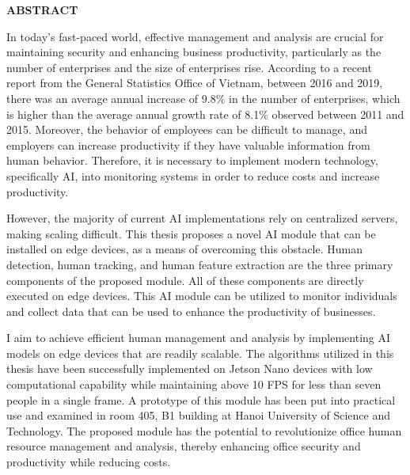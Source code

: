\documentclass[../main.tex]{subfiles}
\begin{document}
\begin{center}
    \Large{\textbf{ABSTRACT}}\\
\end{center}
\vspace{1cm}

In today's fast-paced world, effective management and analysis are crucial for maintaining security and enhancing business productivity, particularly as the number of enterprises and the size of enterprises rise. According to a recent report from the General Statistics Office of Vietnam, between 2016 and 2019, there was an average annual increase of 9.8\% in the number of enterprises, which is higher than the average annual growth rate of 8.1\% observed between 2011 and 2015. Moreover, the behavior of employees can be difficult to manage, and employers can increase productivity if they have valuable information from human behavior. Therefore, it is necessary to implement modern technology, specifically AI, into monitoring systems in order to reduce costs and increase productivity.

However, the majority of current AI implementations rely on centralized servers, making scaling difficult. This thesis proposes a novel AI module that can be installed on edge devices, as a means of overcoming this obstacle. Human detection, human tracking, and human feature extraction are the three primary components of the proposed module. All of these components are directly executed on edge devices. This AI module can be utilized to monitor individuals and collect data that can be used to enhance the productivity of businesses.

I aim to achieve efficient human management and analysis by implementing AI models on edge devices that are readily scalable. The algorithms utilized in this thesis have been successfully implemented on Jetson Nano devices with low computational capability while maintaining above 10 FPS for less than seven people in a single frame. A prototype of this module has been put into practical use and examined in room 405, B1 building at Hanoi University of Science and Technology. The proposed module has the potential to revolutionize office human resource management and analysis, thereby enhancing office security and productivity while reducing costs.
\end{document}
